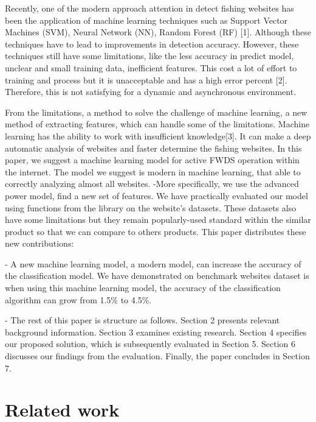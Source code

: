 \documentclass[twocolumn,10pt]{article}
\begin{document}
Recently, one of the modern approach attention in detect fishing websites has been the application of machine learning techniques such as Support Vector Machines (SVM), Neural Network (NN), Random Forest (RF) [1]. Although these techniques have to lead to improvements in detection accuracy. However, these techniques still have some limitations, like the less accuracy in predict model, unclear and small training data, inefficient features. This cost a lot of effort to training and process but it is unacceptable and has a high error percent [2]. Therefore, this is not satisfying for a dynamic and asynchronous environment.

From the limitations, a method to solve the challenge of machine learning, a new method of extracting features, which can handle some of the limitations. Machine learning has the ability to work with insufficient knowledge[3]. It can make a deep automatic analysis of websites and faster determine the fishing websites.
In this paper, we suggest a machine learning model for active FWDS operation within the internet. The model we suggest is modern in machine learning, that able to correctly analyzing almost all websites. -More specifically, we use the advanced power model, find a new set of features. We have practically evaluated our model using functions from the library on the website's datasets. These datasets also have some limitations but they remain popularly-used standard within the similar product so that we can compare to others products.
This paper distributes these new contributions:

- A new machine learning model, a modern model, can increase the accuracy of the classification model. We have demonstrated on benchmark websites dataset is when using this machine learning model, the accuracy of the classification algorithm can grow from 1.5\% to 4.5\%.

- The rest of this paper is structure as follows. Section 2 presents relevant background information. Section 3 examines existing research. Section 4 specifies our proposed solution, which is subsequently evaluated in Section 5. Section 6 discusses our findings from the evaluation. Finally, the paper concludes in Section 7.
\section{Related work}
\end{document}
